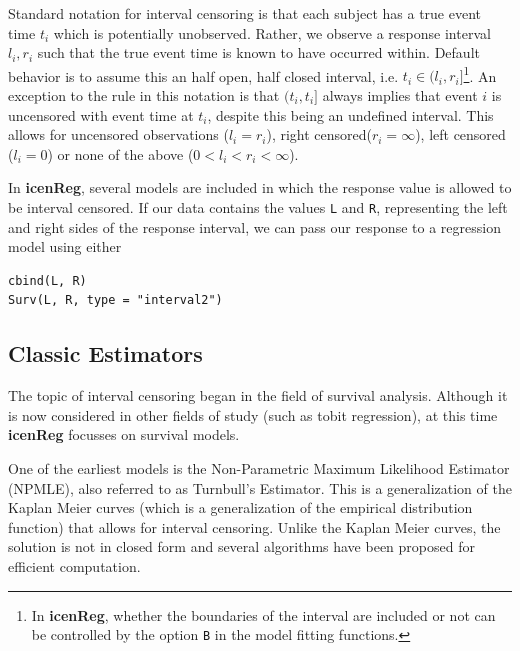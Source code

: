 \documentclass[a4paper]{article}
\begin{document}
Standard notation for interval censoring is that each subject has a true event time $t_i$ which is potentially unobserved. Rather, we observe a response interval $l_i,r_i$ such that the true event time is known to have occurred within. Default behavior is to assume this an half open, half closed interval, i.e. $t_i \in (l_i, r_i]$\footnote{In {\bf icenReg}, whether the boundaries of the interval are included or not can be controlled by the option \texttt{B} in the model fitting functions.}. An exception to the rule in this notation is that $(t_i, t_i]$ always implies that event $i$ is uncensored with event time at $t_i$, despite this being an undefined interval. This allows for uncensored observations ($l_i = r_i$), right censored($r_i = \infty$), left censored ($l_i = 0$) or none of the above ($0 < l_i < r_i < \infty$). 
  
In {\bf icenReg}, several models are included in which the response value is allowed to be interval censored. If our data contains the values \texttt{L} and \texttt{R}, representing the left and right sides of the response interval, we can pass our response to a regression model using either
  
\begin{verbatim}
cbind(L, R)
Surv(L, R, type = "interval2")
\end{verbatim}
  

\subsection{Classic Estimators}
  
The topic of interval censoring began in the field of survival analysis. Although it is now considered in other fields of study (such as tobit regression), at this time {\bf{icenReg}} focusses on survival models. 

One of the earliest models is the Non-Parametric Maximum Likelihood Estimator (NPMLE), also referred to as Turnbull's Estimator. This is a generalization of the Kaplan Meier curves (which is a generalization of the empirical distribution function) that allows for interval censoring. Unlike the Kaplan Meier curves, the solution is not in closed form and several algorithms have been proposed for efficient computation. 

  
\end{document}
